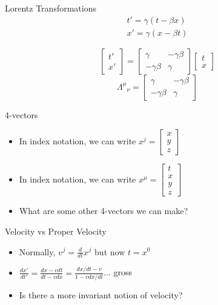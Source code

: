 \documentclass[10pt,xcolor={table,dvipsnames},t]{beamer}
\begin{document}
\begin{frame}{Lorentz Transformations}
    \begin{align*}
        t' = \gamma(t - \beta x) \\
        x' = \gamma(x - \beta t)
    \end{align*}
    
    \begin{equation*}
        \begin{bmatrix}t' \\ x' \end{bmatrix} = \begin{bmatrix}\gamma & -\gamma \beta \\ -\gamma \beta & \gamma  \end{bmatrix} \begin{bmatrix}t \\ x \end{bmatrix}
    \end{equation*}
    \vspace{10pt}
    \begin{equation*}
        {\Lambda^\mu}_\nu = \begin{bmatrix}\gamma & -\gamma \beta \\ -\gamma \beta & \gamma  \end{bmatrix}
    \end{equation*}
\end{frame}

\begin{frame}{4-vectors}
    \begin{itemize}
        \item In index notation, we can write $x^j = \begin{bmatrix} x \\ y \\ z \end{bmatrix}$
        \item In index notation, we can write $x^\mu = \begin{bmatrix} t\\ x \\ y \\ z \end{bmatrix}$
        \item What are some other 4-vectors we can make?
    \end{itemize}
\end{frame}

\begin{frame}{Velocity vs Proper Velocity}
    \begin{itemize}
        \item Normally, $v^{\hspace{1pt}j} = \frac{d}{dt}x^{\hspace{1pt}j}$ but now $t = x^0$
        \item $\frac{dx'}{dt'} = \frac{dx-vdt}{dt-vdx} = \frac{dx/dt-v}{1-vdx/dt}$... gross
        \item Is there a more invariant notion of velocity?
    \end{itemize}
\end{frame}
\end{document}
